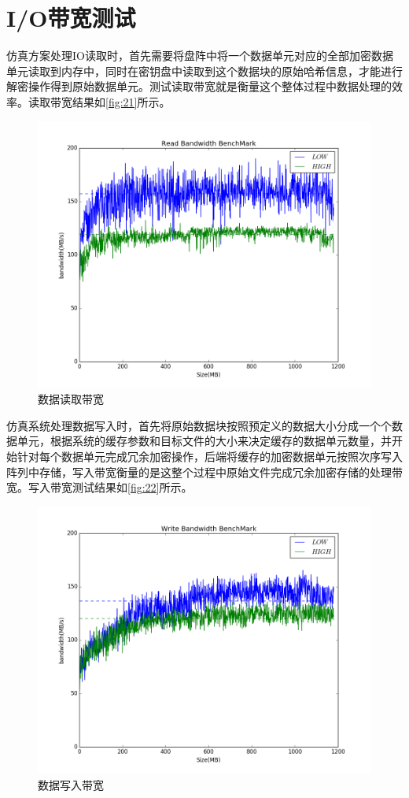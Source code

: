 \section{I/O带宽测试}
仿真方案处理IO读取时，首先需要将盘阵中将一个数据单元对应的全部加密数据单元读取到内存中，同时在密钥盘中读取到这个数据块的原始哈希信息，才能进行解密操作得到原始数据单元。测试读取带宽就是衡量这个整体过程中数据处理的效率。读取带宽结果如\autoref{fig:21}所示。
\begin{figure}[H]
	\centering
	\includegraphics[width=1\textwidth]{Pics/figure_bw_r.png}
	\caption{数据读取带宽}
	\label{fig:21}
\end{figure}
仿真系统处理数据写入时，首先将原始数据块按照预定义的数据大小分成一个个数据单元，根据系统的缓存参数和目标文件的大小来决定缓存的数据单元数量，并开始针对每个数据单元完成冗余加密操作，后端将缓存的加密数据单元按照次序写入阵列中存储，写入带宽衡量的是这整个过程中原始文件完成冗余加密存储的处理带宽。写入带宽测试结果如\autoref{fig:22}所示。
\begin{figure}[H]
	\centering
	\includegraphics[width=1\textwidth]{Pics/figure_bw_w.png}
	\caption{数据写入带宽}
	\label{fig:22}
\end{figure}


